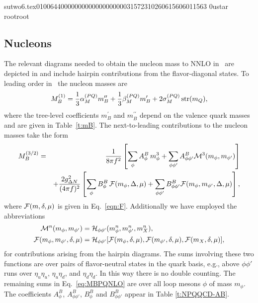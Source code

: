                                                                                                                                                                                                                                                                                       sutwo6.tex                                                                                          0100644 0000000 0000000 00000315723 10260615606 011563  0                                                                                                    ustar   root                            root                                                                                                                                                                                                                   \documentclass[prd,amssymb,amsmath,showpacs,nofootinbib,superscriptaddress]{revtex4}
\begin{document}
%
%
%
%
%
%
%
%
%
%
%
%
\subsection{Nucleons}
The relevant diagrams needed to obtain the nucleon mass to NNLO in 
\PQCPT\ are depicted in \cite{Walker-Loud:2004hf} and include
hairpin contributions from the flavor-diagonal states. 
To leading order in \PQCPT\ the nucleon masses are
\begin{equation}
M^{(1)}_B 
= 
\frac{1}{3} {\alpha}_M^{(PQ)} m_B^{\prime \prime} 
+ 
\frac{1}{3} {\beta}_M^{(PQ)} m'_B 
+ 
2 \sigma_M^{(PQ)} \, \text{str} (m_Q)
,\end{equation}
where the tree-level coefficients $m^{\prime}_B$ and $m^{\prime \prime}_B$ 
depend on the valence quark masses and are given in Table~\ref{t:mB}.
The next-to-leading contributions to the nucleon masses take the form
\begin{eqnarray}
M^{(3/2)}_B 
& = &
\frac{1}{8 \pi f^2} 
\left[
\sum_\phi A_\phi^B \, m_\phi^3 
+
\sum_{\phi\phi'} A^B_{\phi\phi'} \mathcal{M}^3(m_\phi, m_{\phi'})
\right]
\notag \\
&& + \frac{2 g_{{\Delta} N}^2}{(4 \pi f)^2} 
\left[ 
\sum_\phi B_\phi^B  \, {\mathcal F} (m_\phi,{\Delta},\mu)
+
\sum_{\phi\phi'} B^B_{\phi\phi'} {\mathcal F}(m_\phi, m_{\phi'}, {\Delta}, \mu)
\right]
,\label{eq:MBPQNLO}
\end{eqnarray}
where ${\mathcal F}(m,\delta,\mu)$ is given in Eq.~\eqref{eqn:F}.
Additionally we have employed the abbreviations
\begin{align}
\mathcal{M}^n (m_\phi, m_{\phi'})  &=  {\mathcal H}_{\phi\phi'}(m^n_\phi, m^n_{\phi'},m^n_X), \notag \\
{\mathcal F} (m_\phi, m_{\phi'}, {\delta}, \mu) &=  
{\mathcal H}_{\phi \phi'}[{\mathcal F}(m_\phi,{\delta},\mu),{\mathcal F}(m_{\phi'},{\delta},\mu), {\mathcal F}(m_X,{\delta},\mu)]
\label{eq:MPQO}
,\end{align}
for contributions arising from the hairpin diagrams. 
The sums involving these two functions are over pairs of flavor-neutral states in the quark basis, e.g., above $\phi\phi'$ runs over
$\eta_u \eta_u$, $\eta_u \eta_d$, and $\eta_d \eta_d$. In this way there is no double counting.
The remaining sums in Eq.~\eqref{eq:MBPQNLO} are over all loop mesons $\phi$ of mass $m_\phi$.
The coefficients $A^B_\phi$, $A^B_{\phi\phi'}$, $B^B_\phi$ and $B_{\phi\phi'}^B$
appear in Table \ref{t:NPQQCD-AB}. 
\end{document}
